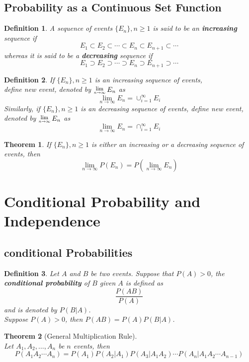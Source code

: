 \documentclass[12pt]{article}
\newcommand{\Lim}[1]{\raisebox{0.5ex}{\scalebox{0.8}{$\displaystyle \lim_{#1}\;$}}}
\newtheorem{definition}{Definition}[section]
\newtheorem{theorem}{Theorem}[section]
\theoremstyle{definition}
\begin{document}
\subsection{Probability as a Continuous Set Function}
\begin{definition}\normalfont A sequence of events $\{E_n\},n\geq 1$ is said to be an \textbf{increasing} sequence if
\[
E_1\subset E_2\subset \cdots \subset E_n\subset E_{n+1}\subset \cdots
\]
whereas it is said to be a \textbf{decreasing} sequence if
\[
E_1\supset E_2\supset \cdots \supset E_n\supset E_{n+1}\supset \cdots
\]
\end{definition}
\begin{definition}\normalfont If $\{E_n\},n\geq 1$ is an increasing sequence of events,\\
define new event, denoted by $\Lim{n\to\infty}E_n$ as
\[
\lim_{n\to\infty}E_n=\cup^{\infty}_{i=1}E_i
\]
Similarly, if $\{E_n\},n\geq 1$ is an decreasing sequence of events, define new event, denoted by $\Lim{n\to\infty}E_n$ as
\[
\lim_{n\to\infty}E_n=\cap^{\infty}_{i=1}E_i
\]
\end{definition}
\begin{theorem}\normalfont If $\{E_n\},n\geq 1$ is either an increasing or a decreasing sequence of events, then
\[
\lim_{n\to\infty}P(E_n)=P\left(\lim_{n\to\infty}E_n\right)
\]
\end{theorem}
\clearpage
\section{Conditional Probability and Independence}
\subsection{conditional Probabilities}
\begin{definition}\normalfont Let $A$ and $B$ be two events. Suppose that $P(A)>0$, the \textbf{conditional probability} of $B$ given $A$ is defined as
\[
\frac{P(AB)}{P(A)}
\]
and is denoted by $P(B|A)$.\\
Suppose $P(A)>0$, then $P(AB)=P(A)P(B|A)$.
\end{definition}
\begin{theorem}[General Multiplication Rule]
\hfill\\\normalfont Let $A_1,A_2,\ldots,A_n$ be $n$ events, then
\[
P(A_1A_2\cdots A_n)=P(A_1)P(A_2|A_1)P(A_3|A_1A_2)\cdots P(A_n|A_1A_2\cdots A_{n-1})
\]
\end{theorem}
\end{document}
